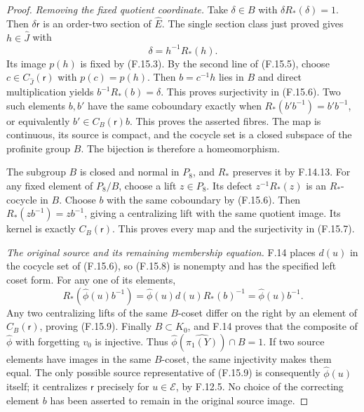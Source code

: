 \begin{proof}
\emph{Removing the fixed quotient coordinate.}
Take $\delta\in B$ with
$\delta R_*(\delta)=1$.
Then $\delta\mathsf r$ is an order-two
section of $\widehat E$.  The single
section class just proved gives $h\in\widehat J$
with
\[
                  \delta=h^{-1}R_*(h).
                                                               \tag{F.15.18}
\]
Its image $p(h)$ is fixed by (F.15.3).
By the second line of (F.15.5), choose
$c\in C_{\widehat J}(\mathsf r)$ with
$p(c)=p(h)$.  Then $b=c^{-1}h$ lies in
$B$ and direct multiplication yields
$b^{-1}R_*(b)=\delta$.
This proves surjectivity in (F.15.6).
Two such elements $b,b'$ have the same
coboundary exactly when
$R_*(b'b^{-1})=b'b^{-1}$, or equivalently
$b'\in C_B(\mathsf r)b$.  This proves the
asserted fibres.  The map is continuous,
its source is compact, and the cocycle
set is a closed subspace of the profinite
group $B$.  The bijection is therefore
a homeomorphism.

The subgroup $B$ is closed and normal in
$P_8$, and $R_*$ preserves it by F.14.13.
For any fixed element of $P_8/B$, choose a
lift $z\in P_8$.  Its defect
$z^{-1}R_*(z)$ is an $R_*$-cocycle in $B$.
Choose $b$ with the same coboundary by
(F.15.6).  Then
$R_*(zb^{-1})=zb^{-1}$, giving a
centralizing lift with the same quotient
image.  Its kernel is exactly
$C_B(\mathsf r)$.
This proves every map and the surjectivity
in (F.15.7).

\emph{The original source and its remaining membership equation.}
F.14 places $d(u)$ in the cocycle set
of (F.15.6), so (F.15.8) is nonempty
and has the specified left coset form.
For any one of its elements,
\[
 R_*(\widehat\phi(u)b^{-1})
  =\widehat\phi(u)d(u)R_*(b)^{-1}
  =\widehat\phi(u)b^{-1}.
                                                               \tag{F.15.19}
\]
Any two centralizing lifts of the same
$B$-coset differ on the right by an
element of $C_B(\mathsf r)$, proving
(F.15.9).
Finally $B\subset K_0$, and F.14 proves
that the composite of $\widehat\phi$
with forgetting $v_0$ is injective.
Thus $\widehat\phi(\widehat{\pi_1(Y)})\cap B=1$.
If two source elements have images in the
same $B$-coset, the same injectivity
makes them equal.
The only possible source representative
of (F.15.9) is consequently
$\widehat\phi(u)$ itself; it centralizes
$\mathsf r$ precisely for
$u\in\mathcal E$, by F.12.5.
No choice of the correcting element
$b$ has been asserted to remain in
the original source image.
\end{proof}
